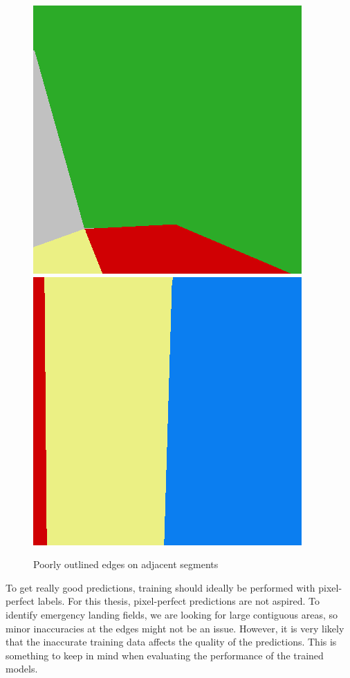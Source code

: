 \begin{figure}
    \includegraphics[width=\LabelConsiderationImageWidth]{images/consideration_labels/69493-label}
    \hspace{1mm}
    \includegraphics[width=\LabelConsiderationImageWidth]{images/consideration_labels/71270-label}

    \caption{Poorly outlined edges on adjacent segments}
    \label{fig:label_considerations}
\end{figure}

To get really good predictions, training should ideally be performed with pixel-perfect labels. For this thesis, pixel-perfect predictions are not aspired. To identify emergency landing fields, we are looking for large contiguous areas, so minor inaccuracies at the edges might not be an issue. However, it is very likely that the inaccurate training data affects the quality of the predictions. This is something to keep in mind when evaluating the performance of the trained models.

\newpage
